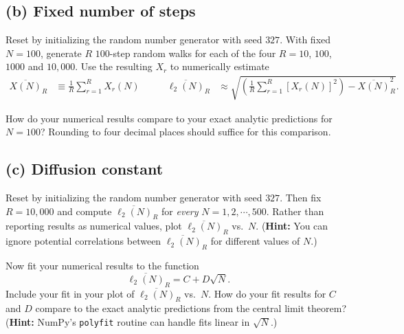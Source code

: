 \documentclass[12 pt]{article} %
\newcommand{\showmarks}[1]{\rightline{\texttt{[#1 marks]}}} %
\begin{document}
\showmarks{2}

\subsection*{(b) Fixed number of steps}
Reset by initializing the random number generator with seed $327$.
With fixed $N = 100$, generate $R$ $100$-step random walks for each of the four $R = 10$, $100$, $1000$ and $10{,}000$.
Use the resulting $X_r$ to numerically estimate
\begin{align*}
  \overline{X(N)}_R & \equiv \frac{1}{R} \sum_{r = 1}^R X_r(N) \qquad &
  \overline{\ell_2(N)}_R & \approx \sqrt{\left(\frac{1}{R} \sum_{r = 1}^R \left[X_r(N)\right]^2\right) - \overline{X(N)}_R^2}.
\end{align*}

How do your numerical results compare to your exact analytic predictions for $N = 100$?
Rounding to four decimal places should suffice for this comparison.

\showmarks{8}

\subsection*{(c) Diffusion constant}
Reset by initializing the random number generator with seed $327$.
Then fix $R = 10{,}000$ and compute $\overline{\ell_2(N)}_R$ for \textit{every} $N = 1, 2, \cdots, 500$.
Rather than reporting results as numerical values, plot $\overline{\ell_2(N)}_R$ vs.\ $N$.
(\textbf{Hint:} You can ignore potential correlations between $\overline{\ell_2(N)}_R$ for different values of $N$.)

\showmarks{4}

Now fit your numerical results to the function
\begin{equation*}
  \overline{\ell_2(N)}_R = C + D \sqrt{N}.
\end{equation*}
Include your fit in your plot of $\overline{\ell_2(N)}_R$ vs.\ $N$.
How do your fit results for $C$ and $D$ compare to the exact analytic predictions from the central limit theorem?
(\textbf{Hint:} NumPy's \texttt{polyfit} routine can handle fits linear in $\sqrt{N}$.)

\showmarks{6}



\end{document}
